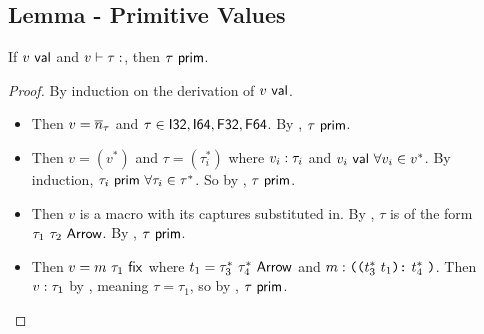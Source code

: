 \documentclass[acmsmall, review]{acmart}
\theoremstyle{definition}
\begin{document}
\subsection{Lemma - Primitive Values}
If $v ~\mathsf{val}$ and $\typed{v}{\tau}$, then $\tau ~\mathsf{prim}$.
\begin{proof}
By induction on the derivation of $v ~\mathsf{val}$.
\begin{itemize}
    \item {}
        Then $v = \overline{n}_\tau$ and $\tau \in {\ensuremath{\mathsf{I32}}, \ensuremath{\mathsf{I64}}, \ensuremath{\mathsf{F32}}, \ensuremath{\mathsf{F64}}}$. By , $\tau ~\mathsf{prim}$.

    \item {}
        Then $v = (v^*)$ and $\tau = (\tau_i^*)$ where $v_i : \tau_i$ and $v_i ~\mathsf{val}~ \forall v_i \in v^*$.
        By induction, $\tau_i ~\mathsf{prim}~ \forall \tau_i \in \tau^*$.
        So by , $\tau ~\mathsf{prim}$.
    
    \item {}
        Then $v$ is a macro with its captures substituted in.
        By , $\tau$ is of the form $\tau_1 ~ \tau_2 ~ \mathsf{Arrow}$.
        By , $\tau ~\mathsf{prim}$.
    
    \item {}
        Then $v = m ~ \tau_1 ~ \mathsf{fix}$ where $t_1 = \tau_3^* ~ \tau_4^* ~ \mathsf{Arrow}$ and $m : \texttt{((} t_3^* ~ t_1 \texttt{):} ~ t_4^* ~ \texttt{)}$.
        Then $v : \tau_1$ by , meaning $\tau = \tau_1$, so by , $\tau ~\mathsf{prim}$.
\end{itemize}
\end{proof}
\end{document}
